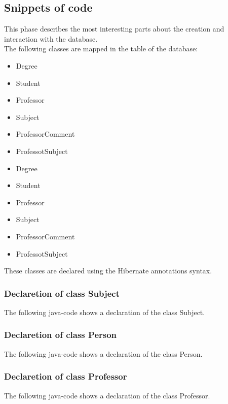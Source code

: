 \documentclass[a4paper, oneside]{article}
\begin{document}
\subsection{Snippets of code}
This phase describes the most interesting parts about the creation and interaction with the database.\\
The following classes are mapped in the table of the database: 

\begin{itemize}	
\item Degree
\item Student
\item Professor
\item Subject
\item ProfessorComment
\item ProfessotSubject
\end{itemize}


\begin{itemize}	
\item Degree
\item Student
\item Professor
\item Subject
\item ProfessorComment
\item ProfessotSubject
\end{itemize}
These classes are declared using the Hibernate annotations syntax.\\

\subsubsection{Declaretion of class Subject}
The following java-code shows a declaration of the class Subject.
\vspace{2mm}

\vspace{5mm}


\subsubsection{Declaretion of class Person}
The following java-code shows a declaration of the class Person.
\vspace{2mm}

\vspace{5mm}


\subsubsection{Declaretion of class Professor}
The following java-code shows a declaration of the class Professor.
\vspace{2mm}

\vspace{5mm}
\end{document}
